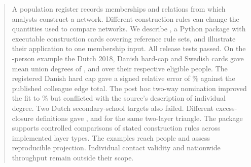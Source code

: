 \begin{abstract}
A population register records memberships and relations from which analysts construct a network. Different construction rules can change the quantities used to compare networks. We describe \builtnet{}, a Python package with \CardCount{} executable construction cards covering \BaseCardCount{} reference rule sets, and illustrate their application to one membership input.
All \TestCount{} release tests passed. On the \SmallPeople{}-person example the Dutch 2018, Danish hard-cap and Swedish cards gave mean union degrees of \SmallDutchDegree{}, \SmallDanishDegree{} and \SmallSwedishDegree{} over their respective eligible people.
The registered Danish hard cap gave a signed relative error of \DanishCappedError\% against the published colleague edge total. The post hoc two-way nomination improved the fit to \DanishTwoWayError\% but conflicted with the source's description of individual degree. Two Dutch secondary-school targets also failed. Different excess-closure definitions gave \ClosurePaper{}, \ClosureLibrary{} and \ClosureTiePair{} for the same two-layer triangle.
The package supports controlled comparisons of stated construction rules across \LayerCount{} implemented layer types. The examples reach \MainPeople{} people and assess reproducible projection. Individual contact validity and nationwide throughput remain outside their scope.
\end{abstract}
